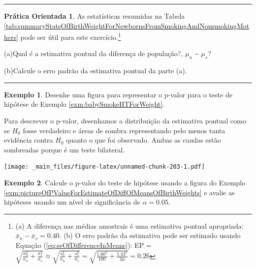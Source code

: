 \documentclass[
]{book}
\theoremstyle{definition}
\theoremstyle{definition}
\newtheorem{example}{Exemplo}[chapter]
\theoremstyle{definition}
\newtheorem{exercise}{Prática Orientada}[chapter]
\theoremstyle{definition}
\theoremstyle{remark}
\begin{document}
\begin{center}\rule{0.5\linewidth}{0.5pt}\end{center}

\begin{exercise}
\protect\hypertarget{exr:unnamed-chunk-202}{}{\label{exr:unnamed-chunk-202} }As estatísticas resumidas na Tabela \ref{tab:summaryStatsOfBirthWeightForNewbornsFromSmokingAndNonsmokingMothers} pode ser útil para este exercício.\footnote{(a) A diferença nas médias amostrais é uma estimativa pontual apropriada: \(\bar{x}_{n} - \bar{x}_{s} = 0.40\). (b) O erro padrão da estimativa pode ser estimado usando Equação (\eqref{eq:seOfDifferenceInMeans}): EP = \(\sqrt{\frac{\sigma_n^2}{n_n} + \frac{\sigma_s^2}{n_s}} \approx \sqrt{\frac{s_n^2}{n_n} + \frac{s_s^2}{n_s}} = \sqrt{\frac{1.60^2}{100} + \frac{1.43^2}{50}} = 0.26\)}

(a)Qual é a estimativa pontual da diferença de população?, \(\mu_{n} - \mu_{s}\)?

(b)Calcule o erro padrão da estimativa pontual da parte (a).
\end{exercise}

\begin{center}\rule{0.5\linewidth}{0.5pt}\end{center}

\begin{example}
\protect\hypertarget{exm:pictureOfPValueForEstimateOfDiffOfMeansOfBirthWeights}{}{\label{exm:pictureOfPValueForEstimateOfDiffOfMeansOfBirthWeights} }Desenhe uma figura para representar o p-valor para o teste de hipótese de Exemplo \ref{exm:babySmokeHTForWeight}.
\end{example}

Para descrever o p-valor, desenhamos a distribuição da estimativa pontual como se \(H_0\) fosse verdadeiro e áreas de sombra representando pelo menos tanta evidência contra \(H_0\) quanto o que foi observado. Ambas as caudas estão sombreadas porque é um teste bilateral.

\texttt{[image: \_main\_files/figure-latex/unnamed-chunk-203-1.pdf]}

\begin{example}
\protect\hypertarget{exm:babySmokeHTForWeightComputePValueAndEvalHT}{}{\label{exm:babySmokeHTForWeightComputePValueAndEvalHT} }
Calcule o p-valor do teste de hipótese usando a figura do Exemplo \ref{exm:pictureOfPValueForEstimateOfDiffOfMeansOfBirthWeights} e avalie as hipóteses usando um nível de significância de \(\alpha=0.05\).
\end{example}
\end{document}
